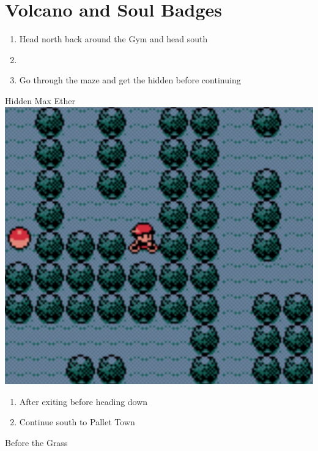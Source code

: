 \chapter{Volcano and Soul Badges}
\vspace{0.5mm}

\begin{paracol}{2}
\begin{enumerate}
	\item Head north back around the Gym and head south
	\item {}
	\item Go through the maze and get the hidden  before continuing
\end{enumerate}

\switchcolumn
\begin{items}{Hidden Max Ether}
	\varwb
	\includegraphics[scale=0.2525]{../Graphics/28. Hidden Max Ether.png}
	\varwe
\end{items}

\switchcolumn
\resume
\begin{enumerate}[resume]
	\item After exiting  before heading down
	\item Continue south to Pallet Town 
\end{enumerate}

\begin{menu}{Before the Grass}
	\varwb
	\begin{packMenu}
		\item \maxEther{} \pointRight{} \return{} 
		\item \maxRepel
	\end{packMenu}
	\varwe
\end{menu}


\end{paracol}
